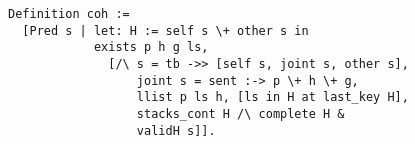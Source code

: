 \begin{lstlisting}
Definition coh := 
  [Pred s | let: H := self s \+ other s in
            exists p h g ls,
              [/\ s = tb ->> [self s, joint s, other s], 
                  joint s = sent :-> p \+ h \+ g,
                  llist p ls h, [ls in H at last_key H],
                  stacks_cont H /\ complete H & 
                  validH s]].  
\end{lstlisting}
